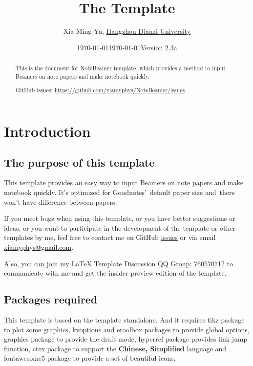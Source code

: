 \documentclass[11pt]{article}
\title{The \pkg{NoteBeamer} Template}
\author[1]{Xia Ming Yu, \href{https://www.hdu.edu.cn}{Hangzhou Dianzi University}}
\date{\today}
\affil[1]{\href{mailto:xiamyphys@gmail.com}{\texttt{xiamyphys@gmail.com}}}
\date{\today\quad Version 2.3a}
\makeatletter
\def\@pkg#1{\texorpdfstring{\href{https://www.ctan.org/pkg/#1}{\textcolor{pkgcolor}{\textsf{#1}}}}{“#1”}}
\def\s@pkg#1{\texorpdfstring{\textcolor{pkgcolor}{\textsf{#1}}}{“#1”}}
\DeclareRobustCommand\pkg{\@ifstar\s@pkg\@pkg}
\def\mode#1{\texorpdfstring{\textcolor{moducolor}{\textsf{#1}}}{“#1”}}
\makeatother
\begin{document}
\maketitle

\begin{abstract}
This is the document for \pkg{NoteBeamer} template, which provides a method to input Beamers on note papers and make notebook quickly.

GitHub issues: \url{https://github.com/xiamyphys/NoteBeamer/issues}

\end{abstract}

\tableofcontents

\section{Introduction}

\subsection{The purpose of this template}
This template provides an easy way to input Beamers on note papers and make notebook quickly. It's optimized for Goodnotes' default paper size and there won't have difference between papers.

If you meet bugs when using this template, or you have better suggestions or ideas, or you want to participate in the development of the template or other templates by me, feel free to contact me on GitHub \href{https://github.com/xiamyphys/NoteBeamer/issues}{issues} or via email \href{mailto:xiamyphys@gmail.com}{xiamyphys@gmail.com}.

Also, you can join my \textsf\LaTeX{} Template Discussion \href{https://qm.qq.com/q/OnHzbNvVAG}{QQ Group: 760570712} to communicate with me and get the insider preview edition of the template.

\subsection{Packages required}
This template is based on the template \pkg{standalone}. And it requires \pkg{tikz} package to plot some graphics, \pkg{kvoptions} and \pkg{etoolbox} packages to provide global options, \pkg{graphics} package to provide the \mode{draft} mode, \pkg{hyperref} package provides link jump function, \pkg{ctex} package to support the \textbf{Chinese, Simplified} language and \pkg{fontawesome5} package to provide a set of beautiful icons.
\end{document}

